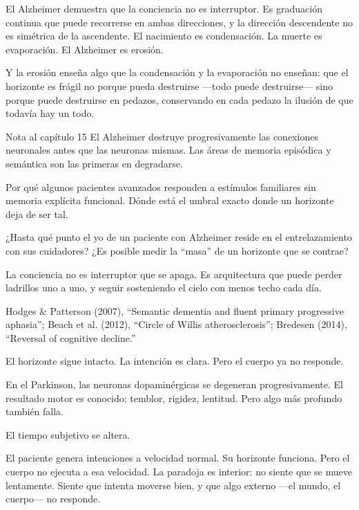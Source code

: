 El Alzheimer demuestra que la conciencia no es interruptor. Es graduación continua que puede recorrerse en ambas direcciones, y la dirección descendente no es simétrica de la ascendente. El nacimiento es condensación. La muerte es evaporación. El Alzheimer es erosión.

Y la erosión enseña algo que la condensación y la evaporación no enseñan: que el horizonte es frágil no porque pueda destruirse —todo puede destruirse— sino porque puede destruirse en pedazos, conservando en cada pedazo la ilusión de que todavía hay un todo.

\begin{notacap}{Nota al capítulo 15}
 El Alzheimer destruye progresivamente las conexiones neuronales antes que las neuronas mismas. Las áreas de memoria episódica y semántica son las primeras en degradarse.

 Por qué algunos pacientes avanzados responden a estímulos familiares sin memoria explícita funcional. Dónde está el umbral exacto donde un horizonte deja de ser tal.

 ¿Hasta qué punto el yo de un paciente con Alzheimer reside en el entrelazamiento con sus cuidadores? ¿Es posible medir la “masa” de un horizonte que se contrae?

 La conciencia no es interruptor que se apaga. Es arquitectura que puede perder ladrillos uno a uno, y seguir sosteniendo el cielo con menos techo cada día.

 Hodges \& Patterson (2007), “Semantic dementia and fluent primary progressive aphasia”; Beach et al. (2012), “Circle of Willis atherosclerosis”; Bredesen (2014), “Reversal of cognitive decline.”
\end{notacap}
\noindent {}

El horizonte sigue intacto. La intención es clara. Pero el cuerpo ya no responde.

\noindent En el Parkinson, las neuronas dopaminérgicas se degeneran progresivamente. El resultado motor es conocido: temblor, rigidez, lentitud. Pero algo más profundo también falla.

El tiempo subjetivo se altera.

El paciente genera intenciones a velocidad normal. Su horizonte funciona. Pero el cuerpo no ejecuta a esa velocidad. La paradoja es interior: no siente que se mueve lentamente. Siente que intenta moverse bien, y que algo externo —el mundo, el cuerpo— no responde.

